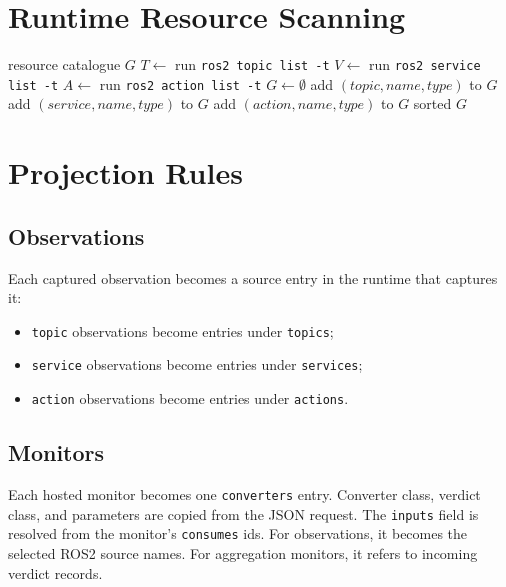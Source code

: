 \documentclass[11pt]{article}
\begin{document}
\section{Runtime Resource Scanning}

\begin{algorithm}[H]
\caption{Scan ROS2 resources}
\begin{algorithmic}[1]
\Ensure resource catalogue $G$
\State $T \gets$ run \texttt{ros2 topic list -t}
\State $V \gets$ run \texttt{ros2 service list -t}
\State $A \gets$ run \texttt{ros2 action list -t}
\State $G \gets \emptyset$
  \State add $(topic,name,type)$ to $G$
\EndFor
{}
  \State add $(service,name,type)$ to $G$
\EndFor
{}
  \State add $(action,name,type)$ to $G$
\EndFor
\State \Return sorted $G$
\end{algorithmic}
\end{algorithm}

\clearpage
\section{Projection Rules}

\subsection{Observations}

Each captured observation becomes a source entry in the runtime that captures
it:

\begin{itemize}
  \item \texttt{topic} observations become entries under \texttt{topics};
  \item \texttt{service} observations become entries under \texttt{services};
  \item \texttt{action} observations become entries under \texttt{actions}.
\end{itemize}

\subsection{Monitors}

Each hosted monitor becomes one \texttt{converters} entry. Converter class,
verdict class, and parameters are copied from the JSON request. The
\texttt{inputs} field is resolved from the monitor's \texttt{consumes} ids.
For observations, it becomes the selected ROS2 source names. For aggregation
monitors, it refers to incoming verdict records.
\end{document}
